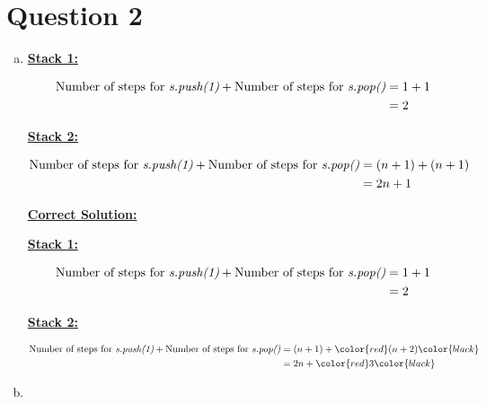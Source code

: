 \documentclass[12pt]{article}
\begin{document}
\section*{Question 2 }
\begin{enumerate}[a.]
    \item

    \underline{\textbf{Stack 1:}}

    \bigskip

    \begin{align*}
        \text{Number of steps for \textit{s.push(1)}} + \text{Number of steps for \textit{s.pop()}} &= 1 + 1\\
        &= 2
    \end{align*}

    \bigskip

    \underline{\textbf{Stack 2:}}

    \bigskip

    \begin{align*}
        \text{Number of steps for \textit{s.push(1)}} + \text{Number of steps for \textit{s.pop()}} &= (n+1) + (n+1)\\
        &= 2n + 1
    \end{align*}

    \newpage

    \begin{mdframed}
        \underline{\textbf{Correct Solution:}}

        \bigskip

        \underline{\textbf{Stack 1:}}

        \begin{align*}
            \text{Number of steps for \textit{s.push(1)}} + \text{Number of steps for \textit{s.pop()}} &= 1 + 1\\
            &= 2
        \end{align*}

        \bigskip

        \underline{\textbf{Stack 2:}}

        \begin{align*}
            \text{Number of steps for \textit{s.push(1)}} + \text{Number of steps for \textit{s.pop()}} &= (n+1) + \color{red}(n+2)\color{black}\\
            &= 2n + \color{red}3\color{black}
        \end{align*}
    \end{mdframed}

    \item


\end{enumerate}
\end{document}
